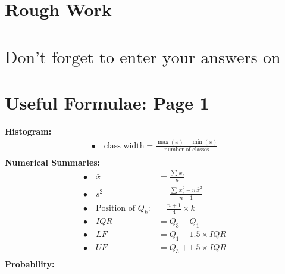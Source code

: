 \documentclass[12pt]{article}
\begin{document}
\newpage

\section*{Rough Work\\[23cm]}
\section*{\hspace{2cm}$\boxed{\text{Don't forget to enter your answers on the last page!}}$}

\newpage


\section*{Useful Formulae: Page 1\\[0.3cm]}
{\bf Histogram:}\\[-0.8cm]
\begin{align*}
\bullet\quad \text{class width} = \frac{\max(x) - \min(x)}{\text{number of classes}}\\
\end{align*}
{\bf Numerical Summaries:}\\[-0.8cm]
\begin{align*}
\bullet\quad \bar x &= \frac{\sum\,x_i}{n}\\[0.6cm]
\bullet\quad s^2 &= \frac{\sum\,x_i^2 - n\,\bar x^2}{n-1}\\[0.6cm]
\bullet\quad \text{Position of } Q_k:& \quad \frac{n+1}{4}\times k \\[0.6cm]
\bullet\quad IQR &= Q_3 - Q_1 \\[0.6cm]
\bullet\quad LF &= Q_1 - 1.5 \times IQR \\[0.6cm]
\bullet\quad UF &= Q_3 + 1.5 \times IQR\\
\end{align*}
{\bf Probability:}\\[-0.8cm]
\end{document}
